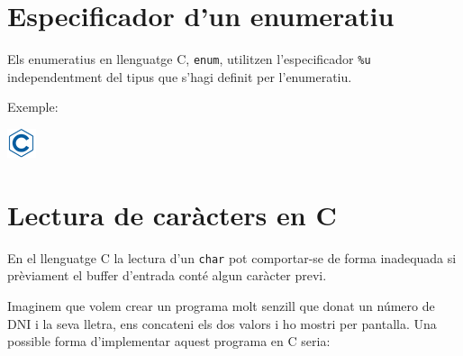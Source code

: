\documentclass[]{book}
\newenvironment{Shaded}{\begin{snugshade}}{\end{snugshade}}
\newcommand{\KeywordTok}[1]{\textcolor[rgb]{0.13,0.29,0.53}{\textbf{#1}}}
\newcommand{\DataTypeTok}[1]{\textcolor[rgb]{0.13,0.29,0.53}{#1}}
\newcommand{\DecValTok}[1]{\textcolor[rgb]{0.00,0.00,0.81}{#1}}
\newcommand{\SpecialCharTok}[1]{\textcolor[rgb]{0.00,0.00,0.00}{#1}}
\newcommand{\StringTok}[1]{\textcolor[rgb]{0.31,0.60,0.02}{#1}}
\newcommand{\ImportTok}[1]{#1}
\newcommand{\ControlFlowTok}[1]{\textcolor[rgb]{0.13,0.29,0.53}{\textbf{#1}}}
\newcommand{\PreprocessorTok}[1]{\textcolor[rgb]{0.56,0.35,0.01}{\textit{#1}}}
\newcommand{\NormalTok}[1]{#1}
\begin{document}
\section{Especificador d'un
enumeratiu}\label{especificador-dun-enumeratiu}

Els enumeratius en llenguatge C, \texttt{enum}, utilitzen
l'especificador \texttt{\%u} independentment del tipus que s'hagi
definit per l'enumeratiu.

Exemple:

\includegraphics{./img/c.png}

\begin{Shaded}
\end{Shaded}

\section{Lectura de caràcters en C}\label{lectura-de-caracters-en-c}

En el llenguatge C la lectura d'un \texttt{char} pot comportar-se de
forma inadequada si prèviament el buffer d'entrada conté algun caràcter
previ.

Imaginem que volem crear un programa molt senzill que donat un número de
DNI i la seva lletra, ens concateni els dos valors i ho mostri per
pantalla. Una possible forma d'implementar aquest programa en C seria:
\end{document}
